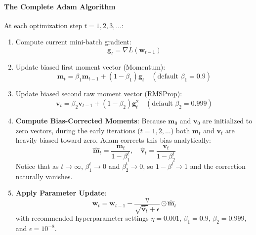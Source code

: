 \paragraph{The Complete Adam Algorithm}
At each optimization step $t = 1, 2, 3, \dots$:
\begin{enumerate}
    \item Compute current mini-batch gradient:
    \begin{equation}
    \mathbf{g}_t = \nabla L(\mathbf{w}_{t-1})
    \end{equation}
    \item Update biased first moment vector (Momentum):
    \begin{equation}
    \mathbf{m}_t = \beta_1 \mathbf{m}_{t-1} + (1 - \beta_1) \mathbf{g}_t \quad (\text{default } \beta_1 = 0.9)
    \end{equation}
    \item Update biased second raw moment vector (RMSProp):
    \begin{equation}
    \mathbf{v}_t = \beta_2 \mathbf{v}_{t-1} + (1 - \beta_2) \mathbf{g}_t^2 \quad (\text{default } \beta_2 = 0.999)
    \end{equation}
    \item \textbf{Compute Bias-Corrected Moments}: Because $\mathbf{m}_0$ and $\mathbf{v}_0$ are initialized to zero vectors, during the early iterations ($t = 1, 2, \dots$) both $\mathbf{m}_t$ and $\mathbf{v}_t$ are heavily biased toward zero. Adam corrects this bias analytically:
    \begin{equation}
    \hat{\mathbf{m}}_t = \frac{\mathbf{m}_t}{1 - \beta_1^t}, \quad \hat{\mathbf{v}}_t = \frac{\mathbf{v}_t}{1 - \beta_2^t}\label{eq:adam_bias_correction}
    \end{equation}
    Notice that as $t \to \infty$, $\beta_1^t \to 0$ and $\beta_2^t \to 0$, so $1 - \beta^t \to 1$ and the correction naturally vanishes.
    \item \textbf{Apply Parameter Update}:
    \begin{equation}
    \mathbf{w}_t = \mathbf{w}_{t-1} - \frac{\eta}{\sqrt{\hat{\mathbf{v}}_t} + \epsilon} \odot \hat{\mathbf{m}}_t\label{eq:adam_final_update}
    \end{equation}
    with recommended hyperparameter settings $\eta = 0.001$, $\beta_1 = 0.9$, $\beta_2 = 0.999$, and $\epsilon = 10^{-8}$.
\end{enumerate}

